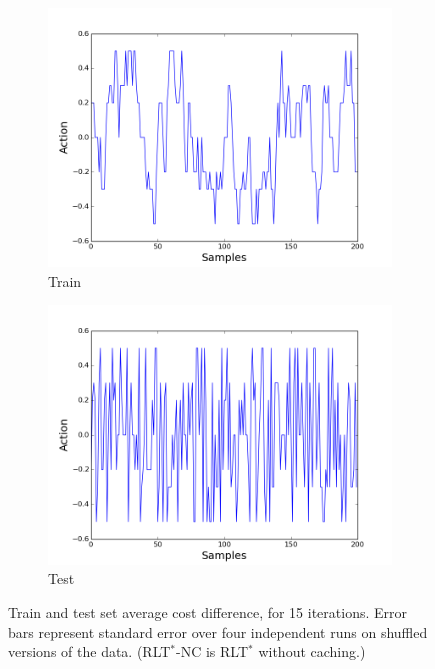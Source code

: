 \documentclass[a4paper,11pt]{report}
\begin{document}
\begin{figure}[t]
	\centering
      \begin{subfigure}[b]{0.45\columnwidth}

    \includegraphics[clip=true,width=1.\textwidth]{figures/action_11.png}
    \caption{Train}
    \label{fig:train_results}
  \end{subfigure}
  \begin{subfigure}[b]{0.45\columnwidth}
    \includegraphics[clip=true,width=1.\textwidth]{figures/action_c20.png}
    \caption{Test}
    \label{fig:test_results}
  \end{subfigure} 

  \caption[Train and test set average cost difference, for 15 iterations.]{Train and test set average cost difference, for 15 iterations. Error bars represent standard error over four independent runs on shuffled versions of the data. (RLT$^*$-NC is RLT$^*$ without caching.)}
  \label{fig:exploration}
\end{figure}
\end{document}

